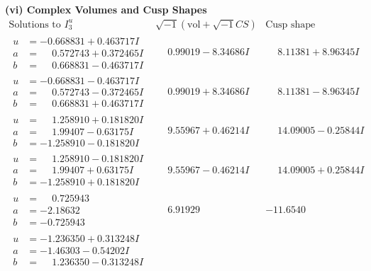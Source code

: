 \documentclass[1p]{elsarticle_modified}
\theoremstyle{definition}
\newcommand{\I}{\sqrt{-1}}
\begin{document}
\newpage\flushleft \textbf{(vi) Complex Volumes and Cusp Shapes}
$$\begin{array}{c|c|c}  
\text{Solutions to }I^u_{3}& \I (\text{vol} + \sqrt{-1}CS) & \text{Cusp shape}\\
 \hline 
\begin{aligned}
u &= -0.668831 + 0.463717 I \\
a &= \phantom{-}0.572743 + 0.372465 I \\
b &= \phantom{-}0.668831 - 0.463717 I\end{aligned}
 & \phantom{-}0.99019 - 8.34686 I & \phantom{-}8.11381 + 8.96345 I \\ \hline\begin{aligned}
u &= -0.668831 - 0.463717 I \\
a &= \phantom{-}0.572743 - 0.372465 I \\
b &= \phantom{-}0.668831 + 0.463717 I\end{aligned}
 & \phantom{-}0.99019 + 8.34686 I & \phantom{-}8.11381 - 8.96345 I \\ \hline\begin{aligned}
u &= \phantom{-}1.258910 + 0.181820 I \\
a &= \phantom{-}1.99407 - 0.63175 I \\
b &= -1.258910 - 0.181820 I\end{aligned}
 & \phantom{-}9.55967 + 0.46214 I & \phantom{-}14.09005 - 0.25844 I \\ \hline\begin{aligned}
u &= \phantom{-}1.258910 - 0.181820 I \\
a &= \phantom{-}1.99407 + 0.63175 I \\
b &= -1.258910 + 0.181820 I\end{aligned}
 & \phantom{-}9.55967 - 0.46214 I & \phantom{-}14.09005 + 0.25844 I \\ \hline\begin{aligned}
u &= \phantom{-}0.725943\phantom{ +0.000000I} \\
a &= -2.18632\phantom{ +0.000000I} \\
b &= -0.725943\phantom{ +0.000000I}\end{aligned}
 & \phantom{-}6.91929\phantom{ +0.000000I} & -11.6540\phantom{ +0.000000I} \\ \hline\begin{aligned}
u &= -1.236350 + 0.313248 I \\
a &= -1.46303 - 0.54202 I \\
b &= \phantom{-}1.236350 - 0.313248 I\end{aligned}

\end{array}$$
\end{document}
